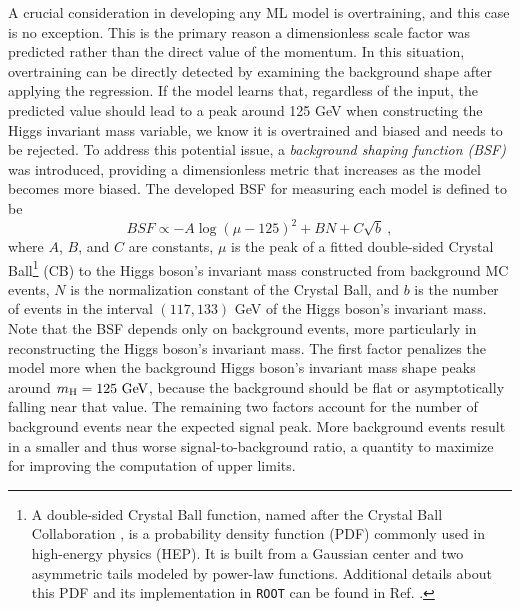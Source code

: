 A crucial consideration in developing any ML model is overtraining, and this case is no exception. This is the primary reason a dimensionless scale factor was predicted rather than the direct value of the momentum. In this situation, overtraining can be directly detected by examining the background shape after applying the regression. If the model learns that, regardless of the input, the predicted value should lead to a peak around 125 GeV when constructing the Higgs invariant mass variable, we know it is overtrained and biased and needs to be rejected. To address this potential issue, a \textit{background shaping function (BSF)} was introduced, providing a dimensionless metric that increases as the model becomes more biased. The developed BSF for measuring each model is defined to be
\begin{equation*}
    BSF \propto -A\log{(\mu-125)^2} + B N + C \sqrt{b}\ ,
\end{equation*}
where $A$, $B$, and $C$ are constants, $\mu$ is the peak of a fitted double-sided Crystal Ball\footnote{A double-sided Crystal Ball function, named after the Crystal Ball Collaboration \cite{A2:CB}, is a probability density function (PDF) commonly used in high-energy physics (HEP). It is built from a Gaussian center and two asymmetric tails modeled by power-law functions. Additional details about this PDF and its implementation in \verb+ROOT+ can be found in Ref. \cite{CERN:root_CB}.} (CB) to the Higgs boson's invariant mass constructed from background MC events, $N$ is the normalization constant of the Crystal Ball, and $b$ is the number of events in the interval $(117, 133)$ GeV of the Higgs boson's invariant mass. Note that the BSF depends only on background events, more particularly in reconstructing the Higgs boson's invariant mass. The first factor penalizes the model more when the background Higgs boson's invariant mass shape peaks around $m_\text{H}=125\ \text{GeV}$, because the background should be flat or asymptotically falling near that value. The remaining two factors account for the number of background events near the expected signal peak. More background events result in a smaller and thus worse signal-to-background ratio, a quantity to maximize for improving the computation of upper limits.

